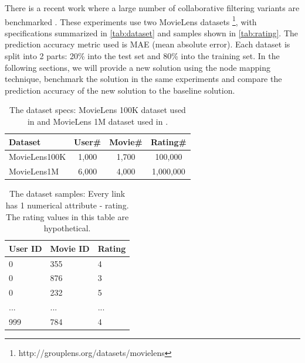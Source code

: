 \documentclass[twocolumn]{article}
\begin{document}
There is a recent work where a large number of collaborative 
filtering variants are benchmarked \cite{polatidis2016multi}.
These experiments use two MovieLens datasets \cite{harper2015movielens} 
\footnote{http://grouplens.org/datasets/movielens},
with specifications summarized in \autoref{tab:dataset} and samples shown in 
\autoref{tab:rating}.
The prediction accuracy metric used is MAE (mean absolute error).
Each dataset is split into 2 parts: 20\% into the test set and 80\% into the 
training set.
In the following sections, we will provide a new solution using the node 
mapping technique, benchmark the solution in the same experiments and compare 
the 
prediction accuracy of the new solution to the baseline solution.
\begin{table}[h]
	\centering
	\caption{The dataset specs: MovieLens 100K dataset used in 
		\cite{hwang2016efficient} and 
		MovieLens 1M dataset used in \cite{polatidis2016multi}.}
	\begin{tabularx}{0.5\textwidth}{ |X|c|c|c|}  \hline
		\textbf{Dataset} & \textbf{User\#} & \textbf{Movie\#} & 		
		\textbf{Rating\#} 
		\\ \hline
		MovieLens100K & 1,000 & 1,700 & 100,000 \\ \hline
		MovieLens1M & 6,000 & 4,000 & 1,000,000 \\ \hline
	\end{tabularx}
	\label{tab:dataset}
\end{table}
\begin{table}[h]
	\centering
	\caption{The dataset samples: Every link has 1 numerical attribute - 
		rating. The rating values in this table are hypothetical.}
	\begin{tabularx}{0.5\textwidth}{ |X|X|X| }  \hline
		\textbf{User ID} & \textbf{Movie ID} & \textbf{Rating} \\ \hline
		0 & 355 & 4 \\ \hline
		0 & 876 & 3 \\ \hline
		0 & 232 & 5 \\ \hline
		... & ... & ... \\ \hline
		999 & 784 & 4 \\ \hline
	\end{tabularx}
	\label{tab:rating}
\end{table}
\end{document}
